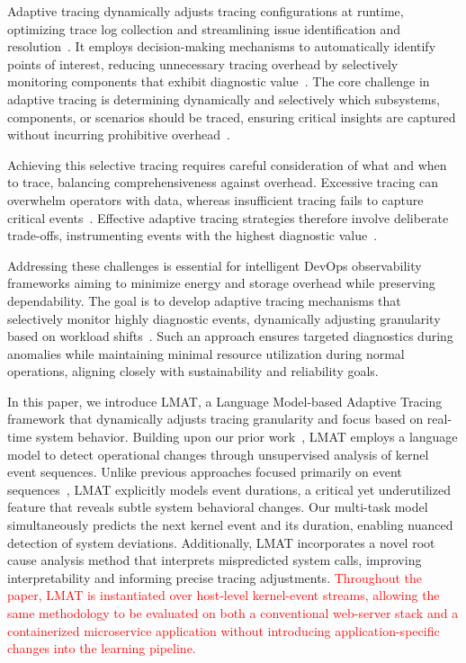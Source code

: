 \documentclass[preprint,12pt]{elsarticle}
\begin{document}
Adaptive tracing dynamically adjusts tracing configurations at runtime, optimizing trace log collection and streamlining issue identification and resolution~\cite{peiris2012adapting}. It employs decision-making mechanisms to automatically identify points of interest, reducing unnecessary tracing overhead by selectively monitoring components that exhibit diagnostic value~\cite{ates2019automated}. The core challenge in adaptive tracing is determining dynamically and selectively which subsystems, components, or scenarios should be traced, ensuring critical insights are captured without incurring prohibitive overhead~\cite{gebai2018survey}.


Achieving this selective tracing requires careful consideration of what and when to trace, balancing comprehensiveness against overhead. Excessive tracing can overwhelm operators with data, whereas insufficient tracing fails to capture critical events~\cite{ates2019automated, zhang2020diagnostic}. Effective adaptive tracing strategies therefore involve deliberate trade-offs, instrumenting events with the highest diagnostic value~\cite{ezeme2020framework, fournier2021improving}.

Addressing these challenges is essential for intelligent DevOps observability frameworks aiming to minimize energy and storage overhead while preserving dependability. The goal is to develop adaptive tracing mechanisms that selectively monitor highly diagnostic events, dynamically adjusting granularity based on workload shifts~\cite{fournier2023language}. Such an approach ensures targeted diagnostics during anomalies while maintaining minimal resource utilization during normal operations, aligning closely with sustainability and reliability goals.

In this paper, we introduce LMAT, a Language Model-based Adaptive Tracing framework that dynamically adjusts tracing granularity and focus based on real-time system behavior. Building upon our prior work~\cite{kasraicse}, LMAT employs a language model to detect operational changes through unsupervised analysis of kernel event sequences. Unlike previous approaches focused primarily on event sequences~\cite{song2018exad, nedelkoski2019anomaly, ezeme2020framework, fournier2021improving, fournier2023language}, LMAT explicitly models event durations, a critical yet underutilized feature that reveals subtle system behavioral changes. Our multi-task model simultaneously predicts the next kernel event and its duration, enabling nuanced detection of system deviations. Additionally, LMAT incorporates a novel root cause analysis method that interprets mispredicted system calls, improving interpretability and informing precise tracing adjustments. \textcolor{red}{Throughout the paper, LMAT is instantiated over host-level kernel-event streams, allowing the same methodology to be evaluated on both a conventional web-server stack and a containerized microservice application without introducing application-specific changes into the learning pipeline.}
\end{document}
